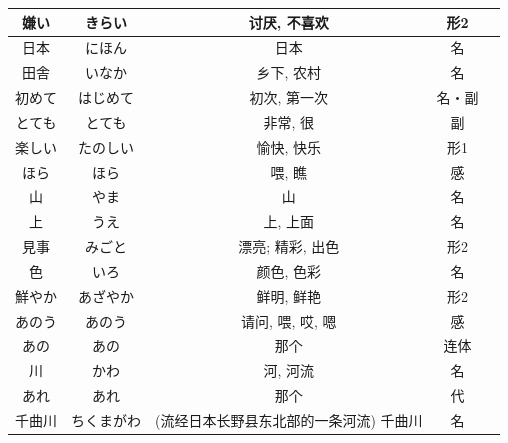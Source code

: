 \begin{longtable}{|c|c|c|c|c|}
嫌い & きらい & 讨厌, 不喜欢 & 形2 & \\ \hline
日本 & にほん & 日本 & 名 & \\ \hline
田舎 & いなか & 乡下, 农村 & 名 & \\ \hline
初めて & はじめて & 初次, 第一次 & 名・副 & \\ \hline
とても & とても & 非常, 很 & 副 & \\ \hline
楽しい & たのしい & 愉快, 快乐 & 形1 & \\ \hline
ほら & ほら & 喂, 瞧 & 感 & \\ \hline
山 & やま & 山 & 名 & \\ \hline
上 & うえ & 上, 上面 & 名 & \\ \hline
見事 & みごと & 漂亮; 精彩, 出色 & 形2 & \\ \hline
色 & いろ & 颜色, 色彩 & 名 & \\ \hline
鮮やか & あざやか & 鲜明, 鲜艳 & 形2 & \\ \hline
あのう & あのう & 请问, 喂, 哎, 嗯 & 感 & \\ \hline
あの & あの & 那个 & 连体 & \\ \hline
川 & かわ & 河, 河流 & 名 & \\ \hline
あれ & あれ & 那个 & 代 & \\ \hline
千曲川 & ちくまがわ & (流经日本长野县东北部的一条河流) 千曲川 & 名 & \\ \hline
\end{longtable}
